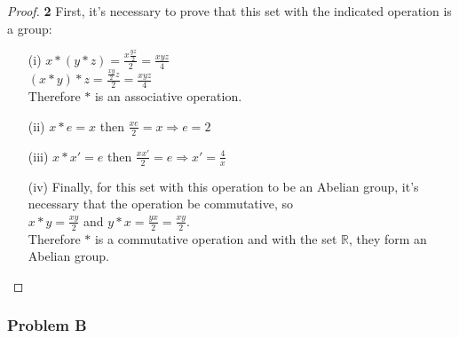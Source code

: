\documentclass[11pt]{article}
\begin{document}
		\begin{proof}{\textbf{2}}
		First, it's necessary to prove that this set with the indicated operation is a group:
		\begin{itemize}
			\item [(i)] $x*(y*z)= \frac{x\frac{yz}{2}}{2}=\frac{xyz}{4}$ \\
			$(x*y)*z= \frac{\frac{xy}{2}z}{2}=\frac{xyz}{4}$ \\
			Therefore $*$ is an associative operation.
			\item [(ii)] $x*e=x$ then $\frac{xe}{2}=x \Rightarrow e=2$
			\item [(iii)] $x*x'=e$ then $\frac{xx'}{2}=e \Rightarrow x'=\frac{4}{x}$
			\item [(iv)] Finally, for this set with this operation to be an Abelian group, it's necessary that the operation be commutative, so \\
			$x*y =\frac{xy}{2}$ and $y*x=\frac{yx}{2}=\frac{xy}{2}$.\\
			Therefore $*$ is a commutative operation and with the set $\mathbb{R}$, they form an Abelian group.
		\end{itemize}
		\end{proof} 

\cleardoublepage 
	\subsubsection*{Problem B}
\end{document}
